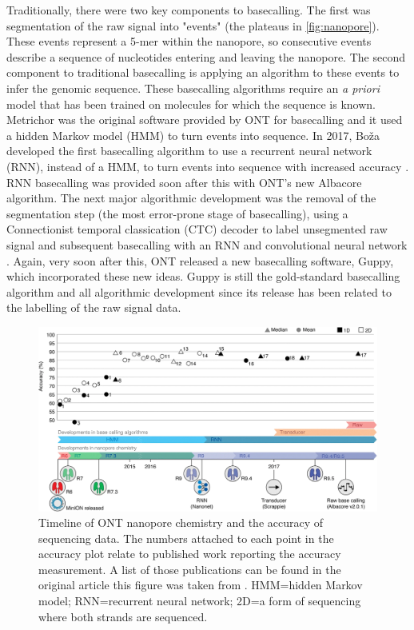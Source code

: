 Traditionally, there were two key components to basecalling. The first was segmentation of the raw signal into "events" (the plateaus in \autoref{fig:nanopore}). These events represent a 5-mer within the nanopore, so consecutive events describe a sequence of nucleotides entering and leaving the nanopore. The second component to traditional basecalling is applying an algorithm to these events to infer the genomic sequence. These basecalling algorithms require an \textit{a priori} model that has been trained on molecules for which the sequence is known. Metrichor was the original software provided by ONT for basecalling and it used a hidden Markov model (HMM) to turn events into sequence. In 2017, Boža \etal{} developed the first basecalling algorithm to use a recurrent neural network (RNN), instead of a HMM, to turn events into sequence with increased accuracy \cite{deepnano}. RNN basecalling was provided soon after this with ONT's new Albacore algorithm. The next major algorithmic development was the removal of the segmentation step (the most error-prone stage of basecalling), using a Connectionist temporal classication (CTC) decoder to label unsegmented raw signal and subsequent basecalling with an RNN and convolutional neural network \cite{chiron2018,Stoiber2017}. Again, very soon after this, ONT released a new basecalling software, Guppy, which incorporated these new ideas. Guppy is still the gold-standard basecalling algorithm and all algorithmic development since its release has been related to the labelling of the raw signal data.

\begin{figure}
\centering
\includegraphics[width=0.9\columnwidth]{Chapter0/Figs/nanopore_timeline.png}
\caption{Timeline of ONT nanopore chemistry and the accuracy of \ont{} sequencing data. The numbers attached to each point in the accuracy plot relate to published work reporting the accuracy measurement. A list of those publications can be found in the original article this figure was taken from \cite{Rang2018}. HMM=hidden Markov model; RNN=recurrent neural network; 2D=a form of \ont{} sequencing where both strands are sequenced.}
\label{fig:nanopore-timeline}
\end{figure}

